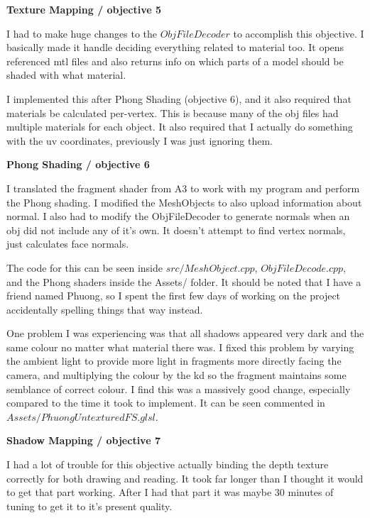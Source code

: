 \documentclass[10pt]{article}
\begin{document}
	\begin{center}
		\bf Texture Mapping / objective 5
	\end{center}
	
	I had to make huge changes to the $ObjFileDecoder$ to accomplish this objective. I basically made it handle deciding everything related to material too. It opens referenced mtl files and also returns info on which parts of a model should be shaded with what material.
	
	I implemented this after Phong Shading (objective 6), and it also required that materials be calculated per-vertex. This is because many of the obj files had multiple materials for each object. It also required that I actually do something with the uv coordinates, previously I was just ignoring them.
	
	\begin{center}
		\bf Phong Shading / objective 6
	\end{center}
	
	I translated the fragment shader from A3 to work with my program and perform the Phong shading. I modified the MeshObjects to also upload information about normal. I also had to modify the ObjFileDecoder to generate normals when an obj did not include any of it's own. It doesn't attempt to find vertex normals, just calculates face normals.
	
	The code for this can be seen inside $src/MeshObject.cpp$, $ObjFileDecode.cpp$, and the Phong shaders inside the Assets/ folder. It should be noted that I have a friend named Phuong, so I spent the first few days of working on the project accidentally spelling things that way instead.
	
	One problem I was experiencing was that all shadows appeared very dark and the same colour no matter what material there was. I fixed this problem by varying the ambient light to provide more light in fragments more directly facing the camera, and multiplying the colour by the kd so the fragment maintains some semblance of correct colour. I find this was a massively good change, especially compared to the time it took to implement. It can be seen commented in $Assets/PhuongUntexturedFS.glsl$.
	
	\begin{center}
		\bf Shadow Mapping / objective 7
	\end{center}
	
	I had a lot of trouble for this objective actually binding the depth texture correctly for both drawing and reading. It took far longer than I thought it would to get that part working. After I had that part it was maybe 30 minutes of tuning to get it to it's present quality.
	
\end{document}
